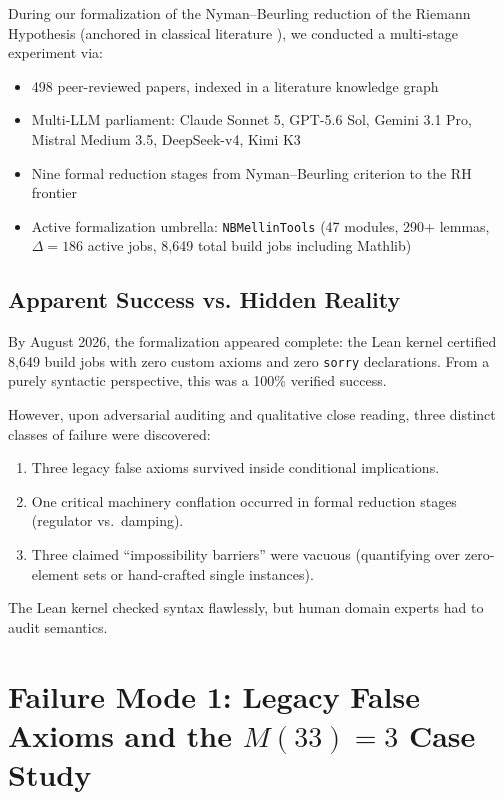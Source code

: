 \documentclass[11pt,a4paper]{article}
\theoremstyle{definition}
\theoremstyle{remark}
\begin{document}
During our formalization of the Nyman--Beurling reduction of the Riemann Hypothesis (anchored in classical literature \cite{IwaniecKowalski2004,MontgomeryVaughan2007,Tenenbaum2015}), we conducted a multi-stage experiment via:

\begin{itemize}[leftmargin=2em]
  \item 498 peer-reviewed papers, indexed in a literature knowledge graph
  \item Multi-LLM parliament: Claude Sonnet 5, GPT-5.6 Sol, Gemini 3.1 Pro, Mistral Medium 3.5, DeepSeek-v4, Kimi K3
  \item Nine formal reduction stages from Nyman--Beurling criterion to the RH frontier
  \item Active formalization umbrella: \texttt{NBMellinTools} (47 modules, 290+ lemmas, $\Delta = 186$ active jobs, 8,649 total build jobs including Mathlib)
\end{itemize}

\subsection{Apparent Success vs. Hidden Reality}

By August 2026, the formalization appeared complete: the Lean kernel certified 8,649 build jobs with zero custom axioms and zero \texttt{sorry} declarations. From a purely syntactic perspective, this was a 100\% verified success.

However, upon adversarial auditing and qualitative close reading, three distinct classes of failure were discovered:
\begin{enumerate}[label=\textbf{\arabic*.}]
  \item Three legacy false axioms survived inside conditional implications.
  \item One critical machinery conflation occurred in formal reduction stages (regulator vs.~damping).
  \item Three claimed ``impossibility barriers'' were vacuous (quantifying over zero-element sets or hand-crafted single instances).
\end{enumerate}

The Lean kernel checked syntax flawlessly, but human domain experts had to audit semantics.

\section{Failure Mode 1: Legacy False Axioms and the $M(33)=3$ Case Study}
\label{sec:failure1}
\end{document}
